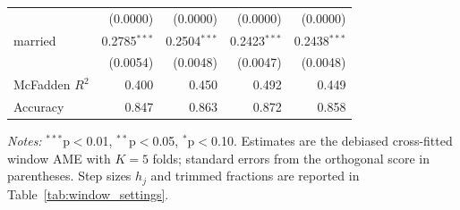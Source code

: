 \begin{table}[htbp]
\begin{threeparttable}
\begin{tabular}{lrrrr}
 & (0.0000) & (0.0000) & (0.0000) & (0.0000) \\
married & 0.2785$^{***}$ & 0.2504$^{***}$ & 0.2423$^{***}$ & 0.2438$^{***}$ \\
 & (0.0054) & (0.0048) & (0.0047) & (0.0048) \\
\midrule
McFadden $R^2$ & 0.400 & 0.450 & 0.492 & 0.449 \\
Accuracy & 0.847 & 0.863 & 0.872 & 0.858 \\
\bottomrule
\end{tabular}
\begin{tablenotes}
\footnotesize
\item \textit{Notes:} $^{***}$p$<$0.01, $^{**}$p$<$0.05, $^{*}$p$<$0.10. Estimates are the debiased cross-fitted window AME with $K=5$ folds; standard errors from the orthogonal score in parentheses. Step sizes $h_j$ and trimmed fractions are reported in Table~\ref{tab:window_settings}.
\end{tablenotes}
\end{threeparttable}
\end{table}